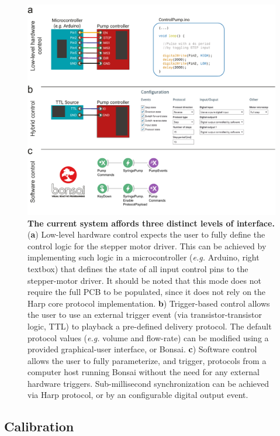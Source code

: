 \begin{itemize}
\begin{figure}
	\centering
	\includegraphics[width=1.0\linewidth]{Figures/Artboard 4.pdf}
	\caption{\textbf{The current system affords three distinct levels of interface.}\\
		(\textbf{a}) Low-level hardware control expects the user to fully define the control logic for the stepper motor driver. This can be achieved by implementing such logic in a microcontroller (\textit{e.g.} Arduino, right textbox) that defines the state of all input control pins to the stepper-motor driver. It should be noted that this mode does not require the full PCB to be populated, since it does not rely on the Harp core protocol implementation. \textbf{b}) Trigger-based control allows the user to use an external trigger event (via transistor-transistor logic, TTL) to playback a pre-defined delivery protocol. The default protocol values (\textit{e.g.} volume and flow-rate) can be modified using a provided graphical-user interface, or Bonsai. \textbf{c}) Software control allows the user to fully parameterize, and trigger, protocols from a computer host running Bonsai without the need for any external hardware triggers. Sub-millisecond synchronization can be achieved via Harp protocol, or by an configurable digital output event.}
	\label{fig:PumpControl} 
\end{figure}

\end{itemize}

\subsection*{Calibration}

